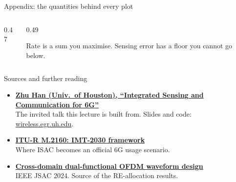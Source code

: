 \begin{frame}{Appendix: the quantities behind every plot}
  \begin{columns}[T,onlytextwidth]
    \begin{column}{0.47\textwidth}
      \small
      \par\vspace{0.75em}
      \par\vspace{0.75em}
      \par\vspace{0.75em}
    \end{column}
    \begin{column}{0.49\textwidth}
      \small
      \par\vspace{0.75em}
      \par\vspace{0.75em}
      \par\vspace{0.75em}
      \textcolor{softgray}{Rate is a sum you maximise. Sensing error has a floor
      you cannot go below.}
    \end{column}
  \end{columns}

  \vspace{0.7em}
\end{frame}

\begin{frame}{Sources and further reading}
  \vspace{-0.2em}
  \footnotesize
  \begin{itemize}\itemsep3pt
    \item \href{https://www2.egr.uh.edu/~zhan2/}{\textbf{Zhu Han (Univ.\ of Houston), ``Integrated Sensing and Communication for 6G''}}\\
      {\scriptsize\color{softgray}The invited talk this lecture is built from.
      Slides and code: \href{https://wireless.egr.uh.edu/}{wireless.egr.uh.edu}.}
    \item \href{https://www.itu.int/rec/R-REC-M.2160/en}{\textbf{ITU-R M.2160: IMT-2030 framework}}\\
      {\scriptsize\color{softgray}Where ISAC becomes an official 6G usage scenario.}
    \item \href{https://ieeexplore.ieee.org/document/10683983}{\textbf{Cross-domain dual-functional OFDM waveform design}}\\
      {\scriptsize\color{softgray}IEEE JSAC 2024. Source of the RE-allocation results.}
  \end{itemize}

\end{frame}
